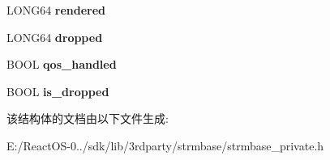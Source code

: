 \begin{DoxyCompactItemize}
\mbox{\label{struct_quality_control_impl_af3e98eb4353324320fb07cea96706532}} 
L\+O\+N\+G64 {\bfseries rendered}
\item 
\mbox{\label{struct_quality_control_impl_ad22b4aa3b21d35653e421f36cecbb2b4}} 
L\+O\+N\+G64 {\bfseries dropped}
\item 
\mbox{\label{struct_quality_control_impl_a5288f46b5f4ae36dfc55daf0eaef633f}} 
B\+O\+OL {\bfseries qos\+\_\+handled}
\item 
\mbox{\label{struct_quality_control_impl_aecb6f343e6c8f4d90c68007bbdd9b7da}} 
B\+O\+OL {\bfseries is\+\_\+dropped}
\end{DoxyCompactItemize}


该结构体的文档由以下文件生成\+:\begin{DoxyCompactItemize}
\item 
E\+:/\+React\+O\+S-\/0../sdk/lib/3rdparty/strmbase/strmbase\+\_\+private.\+h\end{DoxyCompactItemize}
